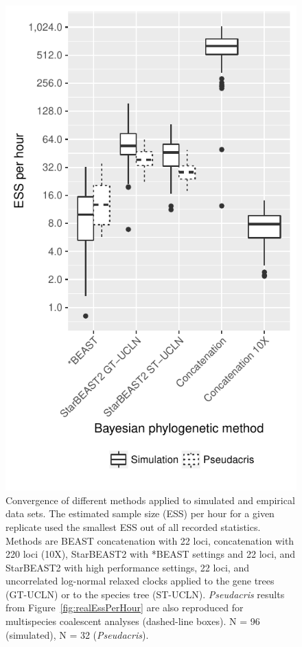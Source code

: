 \documentclass[nogrid]{MBE}%
\begin{document}
\begin{figure}[htb!]
\centering
\includegraphics[width=\columnwidth]{combined_ess_per_hour.pdf}
\caption
{Convergence of different methods applied to simulated and empirical data sets. The estimated sample size (ESS) per hour for a
given replicate used the smallest ESS out of all recorded statistics. Methods are
BEAST concatenation with 22 loci, concatenation with 220 loci (10X), StarBEAST2 with
*BEAST settings and 22 loci, and StarBEAST2 with high performance settings, 22 loci,
and uncorrelated log-normal relaxed clocks applied to the gene trees (GT-UCLN) or
to the species tree (ST-UCLN). \textit{Pseudacris} results from Figure~\ref{fig:realEssPerHour} are also reproduced for
multispecies coalescent analyses (dashed-line boxes). N = 96 (simulated), N = 32
(\textit{Pseudacris}).}
\label{fig:simulatedEssPerHour}
\end{figure}
\end{document}
